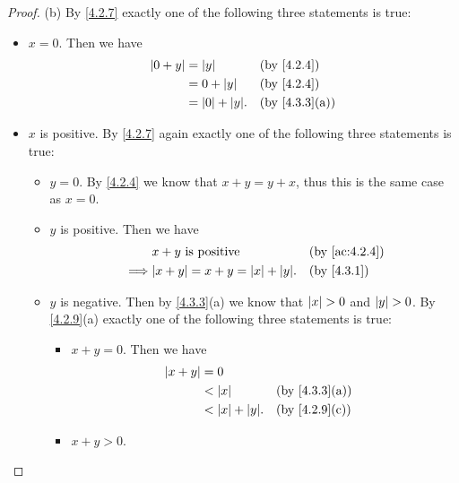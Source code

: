 \begin{proof}{(b)}
  By \cref{4.2.7} exactly one of the following three statements is true:
  \begin{itemize}
    \item \(x = 0\).
          Then we have
          \begin{align*}
            \abs{0 + y} & = \abs{y}            &  & \by{4.2.4}                  \\
                        & = 0 + \abs{y}        &  & \by{4.2.4}                  \\
                        & = \abs{0} + \abs{y}. &  & \text{(by \cref{4.3.3}(a))}
          \end{align*}
    \item \(x\) is positive.
          By \cref{4.2.7} again exactly one of the following three statements is true:
          \begin{itemize}
            \item \(y = 0\).
                  By \cref{4.2.4} we know that \(x + y = y + x\), thus this is the same case as \(x = 0\).
            \item \(y\) is positive.
                  Then we have
                  \begin{align*}
                             & x + y \text{ is positive}                &  & \by{ac:4.2.4} \\
                    \implies & \abs{x + y} = x + y = \abs{x} + \abs{y}. &  & \by{4.3.1}
                  \end{align*}
            \item \(y\) is negative.
                  Then by \cref{4.3.3}(a) we know that \(\left\lvert x\right\rvert > 0\) and \(\left\lvert y\right\rvert > 0\).
                  By \cref{4.2.9}(a) exactly one of the following three statements is true:
                  \begin{itemize}
                    \item \(x + y = 0\).
                          Then we have
                          \begin{align*}
                            \abs{x + y} & = 0                                                   \\
                                        & < \abs{x}            &  & \text{(by \cref{4.3.3}(a))} \\
                                        & < \abs{x} + \abs{y}. &  & \text{(by \cref{4.2.9}(c))}
                          \end{align*}
                    \item \(x + y > 0\).

\end{itemize}
\end{itemize}
\end{itemize}
\end{proof}
